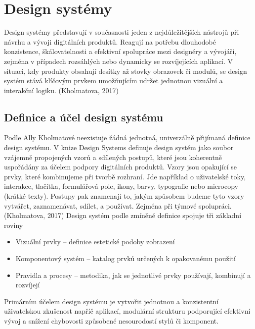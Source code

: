 \section{Design systémy}
Design systémy představují v současnosti jeden z nejdůležitějších nástrojů při návrhu a vývoji digitálních produktů. Reagují na potřebu dlouhodobé konzistence, škálovatelnosti a efektivní spolupráce mezi designéry a vývojáři, zejména v případech rozsáhlých nebo dynamicky se rozvíjejících aplikací. V situaci, kdy produkty obsahují desítky až stovky obrazovek či modulů, se design systém stává klíčovým prvkem umožňujícím udržet jednotnou vizuální a interakční logiku. (Kholmatova, 2017)

\subsection{Definice a účel design systému}
Podle Ally Kholmatové neexistuje žádná jednotná, univerzálně přijímaná definice design systému. V knize Design Systems definuje design systém jako soubor vzájemně propojených vzorů a sdílených postupů, které jsou koherentně uspořádány za účelem podpory digitálních produktů.
Vzory jsou opakující se prvky, které kombinujeme při tvorbě rozhraní. Jde například o uživatelské toky, interakce, tlačítka, formulářová pole, ikony, barvy, typografie nebo microcopy (krátké texty).
Postupy pak znamenají to, jakým způsobem budeme tyto vzory vytvářet, zaznamenávat, sdílet, a používat. Zejména při týmové spolupráci. (Kholmatova, 2017)
Design systém podle zmíněné definice spojuje tři základní roviny
\begin{itemize}
    \item Vizuální prvky – definice estetické podoby zobrazení
    \item Komponentový systém – katalog prvků určených k opakovanému použití
    \item Pravidla a procesy – metodika, jak se jednotlivé prvky používají, kombinují a rozvíjejí
\end{itemize}
Primárním účelem design systému je vytvořit jednotnou a konzistentní uživatelskou zkušenost napříč aplikací, modulární strukturu podporující efektivní vývoj a snížení chybovosti způsobené nesourodostí stylů či komponent.

